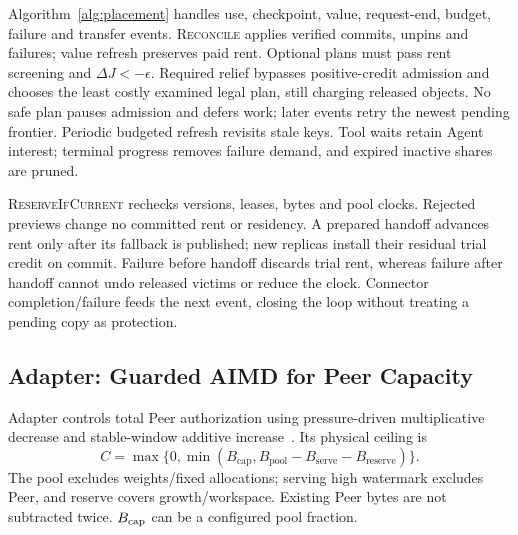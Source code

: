 Algorithm~\ref{alg:placement} handles use, checkpoint, value, request-end,
budget, failure and transfer events. \textsc{Reconcile} applies verified
commits, unpins and failures; value refresh preserves paid rent. Optional
plans must pass rent screening and $\Delta J<-\epsilon$. Required relief
bypasses positive-credit admission and chooses the least costly examined
legal plan, still charging released objects. No safe plan pauses admission
and defers work; later events retry the newest pending frontier.
Periodic budgeted refresh revisits stale keys. Tool waits retain Agent
interest; terminal progress removes failure demand, and expired inactive
shares are pruned.

\textsc{ReserveIfCurrent} rechecks versions, leases, bytes and pool clocks.
Rejected previews change no committed rent or residency. A prepared
handoff advances rent only after its fallback is published; new replicas
install their residual trial credit on commit. Failure before handoff
discards trial rent, whereas failure after handoff cannot undo released
victims or reduce the clock. Connector completion/failure feeds the next
event, closing the loop without treating a pending copy as protection.

\subsection{Adapter: Guarded AIMD for Peer Capacity}
\label{sec:adapter}

Adapter controls total Peer authorization using pressure-driven
multiplicative decrease and stable-window additive
increase~\cite{chiu1989aimd}. Its physical ceiling is
\begin{equation}
 C=\max\{0,\min(B_{\mathrm{cap}},
 B_{\mathrm{pool}}-B_{\mathrm{serve}}-B_{\mathrm{reserve}})\}.
 \label{eq:peer-ceiling}
\end{equation}
The pool excludes weights/fixed allocations; serving high watermark
excludes Peer, and reserve covers growth/workspace. Existing Peer bytes
are not subtracted twice. $B_{\rm cap}$ can be a configured pool fraction.

